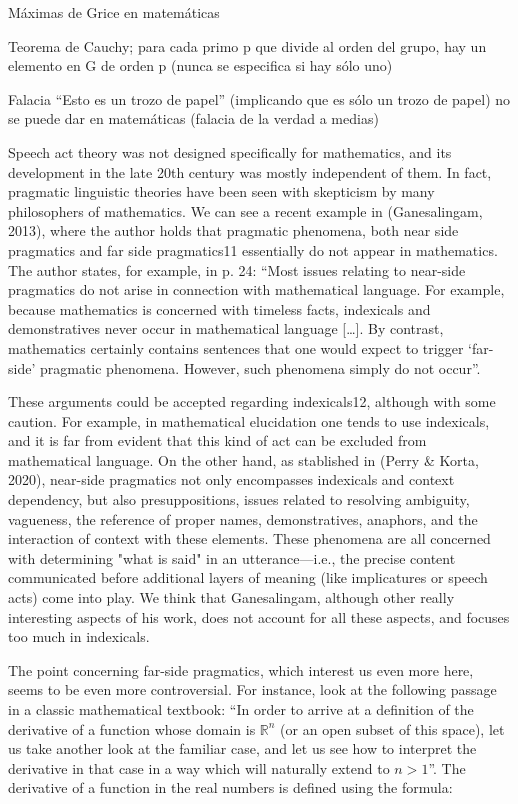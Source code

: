 \documentclass[11pt,a4paper]{book}
\theoremstyle{plain}
\begin{document}
Máximas de Grice en matemáticas 

Teorema de Cauchy; para cada primo p que divide al orden del grupo, hay un elemento en G de orden p (nunca se especifica si hay sólo uno) 

Falacia “Esto es un trozo de papel” (implicando que es sólo un trozo de papel) no se puede dar en matemáticas (falacia de la verdad a medias) 

Speech act theory was not designed specifically for mathematics, and its development in the late 20th century was mostly independent of them. In fact, pragmatic linguistic theories have been seen with skepticism by many philosophers of mathematics. We can see a recent example in (Ganesalingam, 2013), where the author holds that pragmatic phenomena, both near side pragmatics and far side pragmatics11 essentially do not appear in mathematics. The author states, for example, in p. 24: “Most issues relating to near-side pragmatics do not arise in connection with mathematical language. For example, because mathematics is concerned with timeless facts, indexicals and demonstratives never occur in mathematical language […]. By contrast, mathematics certainly contains sentences that one would expect to trigger ‘far-side’ pragmatic phenomena. However, such phenomena simply do not occur”. 

These arguments could be accepted regarding indexicals12, although with some caution. For example, in mathematical elucidation one tends to use indexicals, and it is far from evident that this kind of act can be excluded from mathematical language. On the other hand, as stablished in (Perry \& Korta, 2020), near-side pragmatics not only encompasses indexicals and context dependency, but also presuppositions, issues related to resolving ambiguity, vagueness, the reference of proper names, demonstratives, anaphors, and the interaction of context with these elements. These phenomena are all concerned with determining "what is said" in an utterance—i.e., the precise content communicated before additional layers of meaning (like implicatures or speech acts) come into play. We think that Ganesalingam, although other really interesting aspects of his work, does not account for all these aspects, and focuses too much in indexicals. 

The point concerning far-side pragmatics, which interest us even more here, seems to be even more controversial. For instance, look at the following passage in a classic mathematical textbook: “In order to arrive at a definition of the derivative of a function whose domain is $\mathbb{R}^n$ (or an open subset of this space), let us take another look at the familiar case, and let us see how to interpret the derivative in that case in a way which will naturally extend to $n>1$”. The derivative of a function in the real numbers is defined using the formula: 
\end{document}

